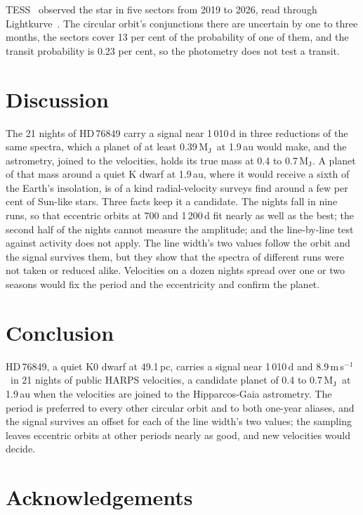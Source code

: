 \documentclass[3p,11pt]{elsarticle}
\newcommand{\ms}{m\,s$^{-1}$}
\newcommand{\Mjup}{M$_\mathrm{J}$}
\begin{document}
TESS~\cite{Ricker2015} observed the star in five sectors from 2019 to 2026, read through
Lightkurve~\cite{Lightkurve2018}. The circular orbit's conjunctions there are uncertain by one to three
months, the sectors cover 13 per cent of the probability of one of them, and the transit probability is
0.23 per cent, so the photometry does not test a transit.

\section{Discussion}\label{sec:discussion}

The 21 nights of HD\,76849 carry a signal near 1\,010\,d in three reductions of the same spectra, which a
planet of at least 0.39\,\Mjup\ at 1.9\,au would make, and the astrometry, joined to the velocities,
holds its true mass at 0.4 to 0.7\,\Mjup. A planet of that mass around a quiet K dwarf at 1.9\,au, where
it would receive a sixth of the Earth's insolation, is of a kind radial-velocity surveys find around a
few per cent of Sun-like stars. Three facts keep it a candidate. The nights fall in nine runs, so that
eccentric orbits at 700 and 1\,200\,d fit nearly as well as the best; the second half of the nights cannot
measure the amplitude; and the line-by-line test against activity does not apply. The line width's two
values follow the orbit and the signal survives them, but they show that the spectra of different runs
were not taken or reduced alike. Velocities on a dozen nights spread over one or two seasons would fix
the period and the eccentricity and confirm the planet.

\section{Conclusion}\label{sec:conclusion}

HD\,76849, a quiet K0 dwarf at 49.1\,pc, carries a signal near 1\,010\,d and 8.9\,\ms\ in 21 nights of
public HARPS velocities, a candidate planet of 0.4 to 0.7\,\Mjup\ at 1.9\,au when the velocities are
joined to the Hipparcos-Gaia astrometry. The period is preferred to every other circular orbit and to
both one-year aliases, and the signal survives an offset for each of the line width's two values; the
sampling leaves eccentric orbits at other periods nearly as good, and new velocities would decide.

\section*{Acknowledgements}
\end{document}
